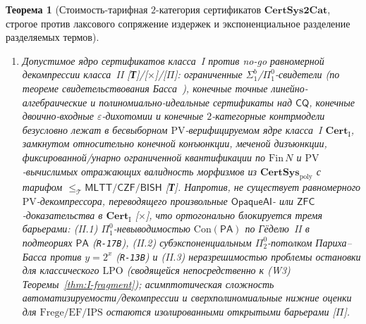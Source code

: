 \documentclass[11pt]{article}
\theoremstyle{plain}
\newtheorem{theorem}{Теорема}[section]
\theoremstyle{definition}
\newcommand{\Con}{\mathrm{Con}}
\newcommand{\PA}{\mathsf{PA}}
\newcommand{\ZFC}{\mathsf{ZFC}}
\begin{document}
\begin{theorem}[Стоимость-тарифная $2$-категория сертификатов $\mathbf{CertSys2Cat}$, строгое против лаксового сопряжение издержек и экспоненциальное разделение разделяемых термов]
\begin{enumerate}[nosep,label=(\roman*)]
\item \emph{Допустимое ядро сертификатов класса~I против no-go равномерной декомпрессии класса~II \textup{[\textbf{Т}]}/\textup{[\textbf{$\times$}]}/\textup{[\textbf{$\Pi$}]}}: ограниченные $\Sigma^b_1$/$\Pi^0_1$-свидетели (по теореме свидетельствования Басса~\cite{Buss1986}), конечные точные линейно-алгебраические и полиномиально-идеальные сертификаты над $\mathsf{CQ}$, конечные двоично-входные $\varepsilon$-дихотомии и конечные $2$-категорные контрмодели безусловно лежат в бесвыборном $\mathrm{PV}$-верифицируемом ядре класса~I $\mathbf{Cert}_{\mathrm{I}}$, замкнутом относительно конечной конъюнкции, меченой дизъюнкции, фиксированной/унарно ограниченной квантификации по $\mathrm{Fin}\,N$ и $\mathrm{PV}$-вычислимых отражающих валидность морфизмов из $\mathbf{CertSys}_{\mathrm{poly}}$ с тарифом $\le_{\mathcal{T}} \mathsf{MLTT/CZF/BISH}$ \textup{[\textbf{Т}]}. Напротив, \emph{не существует} равномерного $\mathrm{PV}$-декомпрессора, переводящего произвольные $\mathsf{OpaqueAI}$- или $\ZFC$-доказательства в $\mathbf{Cert}_{\mathrm{I}}$ \textup{[\textbf{$\times$}]}, что ортогонально блокируется тремя барьерами: (II.1) $\Pi^0_1$-невыводимостью $\Con(\PA)$ по Гёделю~II в подтеориях $\PA$ (\texttt{R-17B}), (II.2) субэкспоненциальным $\Pi^0_2$-потолком Париха--Басса против $y = 2^x$ (\texttt{R-13B}) и (II.3) неразрешимостью проблемы остановки для классического $\mathrm{LPO}$ (сводящейся непосредственно к \textup{(W3)} Теоремы~\ref{thm:I-fragment}); асимптотическая сложность автоматизируемости/декомпрессии и сверхполиномиальные нижние оценки для $\mathrm{Frege}/\mathrm{EF}/\mathrm{IPS}$ остаются изолированными открытыми барьерами \textup{[\textbf{$\Pi$}]}.
\end{enumerate}
\end{theorem}
\end{document}

